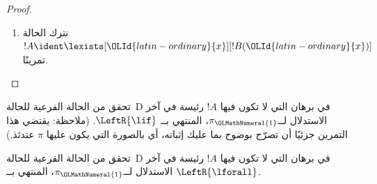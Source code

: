 \documentclass[../../../include/open-logic-section]{subfiles}
\begin{document}
\begin{proof}
\begin{enumerate}
المتتالية النهائية لــ!!{proof}~$\pi_\OLMathNumeral{1}'$ هي $\OLId{greek-variable}{Gamma} \Sequent \OLId{greek-variable}{Delta},
!B(\OLId{latin-ordinary}{c})$، حيث $\OLId{latin-ordinary}{c}$ المتغير المميز لاستدلال~$\RightR{\lforall}$. ولذلك لا يرد
$\OLId{latin-ordinary}{c}$ في~$!B(\OLId{latin-ordinary}{x})$ أو $\OLId{greek-variable}{Gamma}$ أو~$\OLId{greek-variable}{Delta}$. نفرض أن !!{proof}~$\pi$ منتظم،
ومن ثم لا يكون $\OLId{latin-ordinary}{c}$ المتغير المميز إلا لاستدلال~$\RightR{\lforall}$ الآتي،
ولا يرد إلا فوقه، أي لا يرد إلا في~$\pi_\OLMathNumeral{1}'$، وليس متغيرًا مميزًا لاستدلال
في~$\pi_\OLMathNumeral{1}'$. ولما كان $\OLId{latin-ordinary}{c}$ لا يرد في~$\pi_\OLMathNumeral{2}$، فلا يجوز أن يرد في~$\OLId{latin-ordinary}{t}$.
وبحسب  يكون
!!{proof}~$\Subst{\pi_\OLMathNumeral{1}'}{\OLId{latin-ordinary}{t}}{\OLId{latin-ordinary}{c}}$ هو !!a{proof} لــ$\OLId{greek-variable}{Gamma} \Sequent
\OLId{greek-variable}{Delta}, !B(\OLId{latin-ordinary}{t})$. ونطبّق الآن فرض الاستقراء على !!{proof}
\[
\AxiomC{}
\RightLabel{$\Subst{\pi_\OLMathNumeral{1}'}{\OLId{latin-ordinary}{t}}{\OLId{latin-ordinary}{c}}$}
\Deduce$\OLId{greek-variable}{Gamma} \fCenter \OLId{greek-variable}{Delta}, !B(\OLId{latin-ordinary}{t})$
\AxiomC{}
\RightLabel{$\pi_\OLMathNumeral{2}''$}
\Deduce$!B(\OLId{latin-ordinary}{t}), \OLId{greek-variable}{Gamma} \fCenter \OLId{greek-variable}{Delta}$
\RightLabel{\CutCS}
\BinaryInf$\OLId{greek-variable}{Gamma} \fCenter \OLId{greek-variable}{Delta}$
\DisplayProof
\]
(ينطبق فرض الاستقراء لأن !!{formula} القطع هي~$!B(\OLId{latin-ordinary}{t})$، ولذلك تكون رتبة
القطع في !!{proof} أدنى منها في~$\pi$.)
\item نترك الحالة $!A \ident \lexists[\OLId{latin-ordinary}{x}][!B(\OLId{latin-ordinary}{x})]$ تمرينًا.
\end{enumerate}
\end{proof}

\begin{prob}
تحقق من الحالة الفرعية للحالة~D في برهان  التي لا
تكون فيها $!A$ رئيسة في آخر الاستدلال لــ$\pi_\OLMathNumeral{1}$، المنتهي بــ
$\LeftR{\lif}$. (ملاحظة: يقتضي هذا التمرين جزئيًا أن تصرّح بوضوح بما عليك
إثباته، أي بالصورة التي يكون عليها $\pi$ عندئذ.)
\end{prob}

\begin{prob}
تحقق من الحالة الفرعية للحالة~D في برهان  التي لا
تكون فيها $!A$ رئيسة في آخر الاستدلال لــ$\pi_\OLMathNumeral{1}$، المنتهي بــ
$\LeftR{\lforall}$.
\end{prob}
\end{document}
